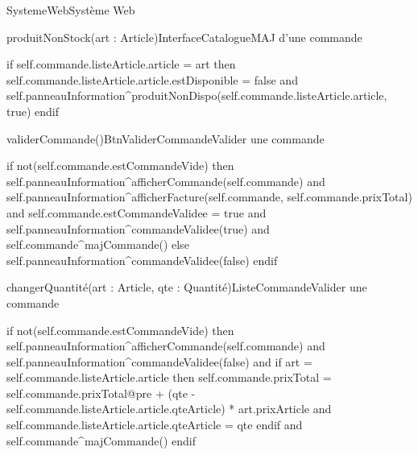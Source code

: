\begin{OM}{SystemeWeb}{Système Web}
    \begin{OMOperation}{produitNonStock(art : Article)}{InterfaceCatalogue}{MAJ d'une commande}
        \begin{OMMessages}
        \end{OMMessages}
        \OMNoPre
        \begin{OMPost}
if self.commande.listeArticle.article = art then
    self.commande.listeArticle.article.estDisponible = false
    and
    self.panneauInformation^produitNonDispo(self.commande.listeArticle.article, true)
endif
        \end{OMPost}
    \end{OMOperation}

    \begin{OMOperation}{validerCommande()}{BtnValiderCommande}{Valider une commande}
        \begin{OMMessages}
        \end{OMMessages}
        \OMNoPre
        \begin{OMPost}
if not(self.commande.estCommandeVide) then
    self.panneauInformation^afficherCommande(self.commande)
    and
    self.panneauInformation^afficherFacture(self.commande, self.commande.prixTotal)
    and
    self.commande.estCommandeValidee = true
    and
    self.panneauInformation^commandeValidee(true)
    and
    self.commande^majCommande()
else
    self.panneauInformation^commandeValidee(false)
endif
        \end{OMPost}
    \end{OMOperation}

    \begin{OMOperation}{changerQuantité(art : Article, qte : Quantité)}{ListeCommande}{Valider une commande}
        \begin{OMMessages}
        \end{OMMessages}
        \OMNoPre
        \begin{OMPost}
if not(self.commande.estCommandeVide) then
    self.panneauInformation^afficherCommande(self.commande)
    and
    self.panneauInformation^commandeValidee(false)
    and
    if art = self.commande.listeArticle.article then
        self.commande.prixTotal = self.commande.prixTotal@pre + (qte - self.commande.listeArticle.article.qteArticle) * art.prixArticle
        and
        self.commande.listeArticle.article.qteArticle = qte
    endif
    and
    self.commande^majCommande()
endif
        \end{OMPost}
    \end{OMOperation}


\end{OM}
